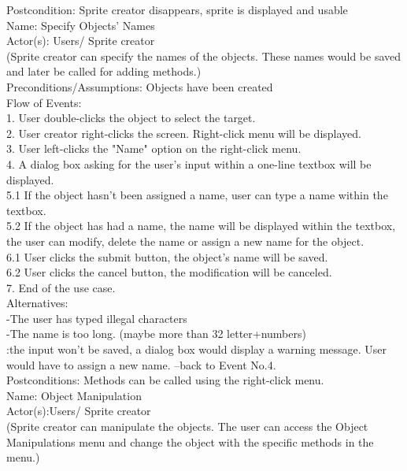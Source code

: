 \documentclass[12pt]{report}
\begin{document}
Postcondition: Sprite creator disappears, sprite is displayed and usable\\[2\baselineskip]

Name: Specify Objects' Names\\
Actor(s): Users/ Sprite creator\\
(Sprite creator can specify the names of the objects. These names would be saved and later be called for adding methods.)\\
Preconditions/Assumptions: Objects have been created\\[1\baselineskip]
Flow of Events: \\
1. User double-clicks the object to select the target.\\
2. User creator right-clicks the screen. Right-click menu will be displayed.\\
3. User left-clicks the "Name" option on the right-click menu.\\
4. A dialog box asking for the user's input within a one-line textbox will be displayed.\\
5.1 If the object hasn't been assigned a name, user can type a name within the textbox.\\
5.2 If the object has had a name, the name will be displayed within the textbox, the user can modify, delete the name or assign a new name for the object.\\
6.1 User clicks the submit button, the object's name will be saved.\\
6.2 User clicks the cancel button, the modification will be canceled. \\
7. End of the use case. \\[1\baselineskip]
Alternatives: \\
-The user has typed illegal characters\\
-The name is too long. (maybe more than 32 letter+numbers)\\
:the input won't be saved, a dialog box would display a warning message. User would have to assign a new name. --back to Event No.4.\\
Postconditions: Methods can be called using the right-click menu.\\[2\baselineskip]
Name: Object Manipulation\\
Actor(s):Users/ Sprite creator\\
(Sprite creator can manipulate the objects. The user can access the Object Manipulations menu and change the object with the specific methods in the menu.)\\
\end{document}

